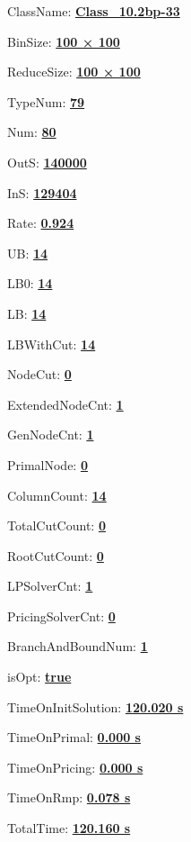 \documentclass[11pt]{article}
\begin{document}
\pagestyle{empty}


ClassName: \underline{\textbf{Class_10.2bp-33}}
\par
BinSize: \underline{\textbf{100 × 100}}
\par
ReduceSize: \underline{\textbf{100 × 100}}
\par
TypeNum: \underline{\textbf{79}}
\par
Num: \underline{\textbf{80}}
\par
OutS: \underline{\textbf{140000}}
\par
InS: \underline{\textbf{129404}}
\par
Rate: \underline{\textbf{0.924}}
\par
UB: \underline{\textbf{14}}
\par
LB0: \underline{\textbf{14}}
\par
LB: \underline{\textbf{14}}
\par
LBWithCut: \underline{\textbf{14}}
\par
NodeCut: \underline{\textbf{0}}
\par
ExtendedNodeCnt: \underline{\textbf{1}}
\par
GenNodeCnt: \underline{\textbf{1}}
\par
PrimalNode: \underline{\textbf{0}}
\par
ColumnCount: \underline{\textbf{14}}
\par
TotalCutCount: \underline{\textbf{0}}
\par
RootCutCount: \underline{\textbf{0}}
\par
LPSolverCnt: \underline{\textbf{1}}
\par
PricingSolverCnt: \underline{\textbf{0}}
\par
BranchAndBoundNum: \underline{\textbf{1}}
\par
isOpt: \underline{\textbf{true}}
\par
TimeOnInitSolution: \underline{\textbf{120.020 s}}
\par
TimeOnPrimal: \underline{\textbf{0.000 s}}
\par
TimeOnPricing: \underline{\textbf{0.000 s}}
\par
TimeOnRmp: \underline{\textbf{0.078 s}}
\par
TotalTime: \underline{\textbf{120.160 s}}
\par
\newpage


\end{document}
